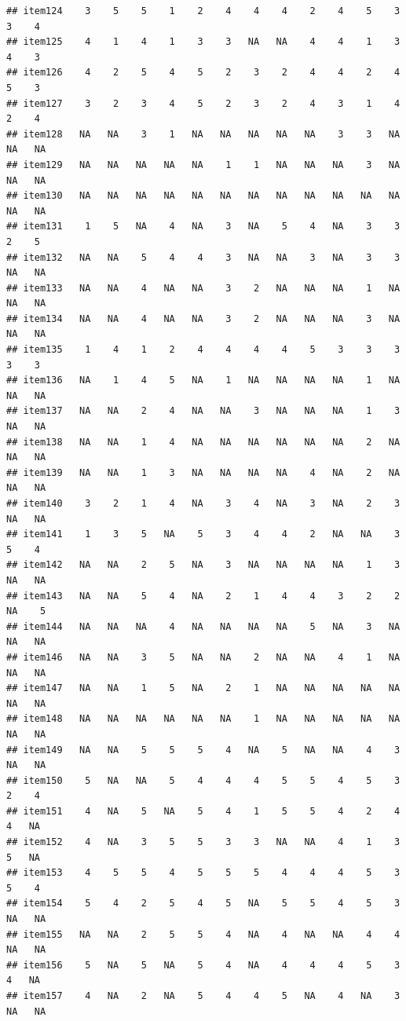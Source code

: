 \documentclass[
  man]{apa6}
\begin{document}
\begin{verbatim}
## item124    3    5    5    1    2    4    4    4    2    4    5    3    3    4
## item125    4    1    4    1    3    3   NA   NA    4    4    1    3    4    3
## item126    4    2    5    4    5    2    3    2    4    4    2    4    5    3
## item127    3    2    3    4    5    2    3    2    4    3    1    4    2    4
## item128   NA   NA    3    1   NA   NA   NA   NA   NA    3    3   NA   NA   NA
## item129   NA   NA   NA   NA   NA    1    1   NA   NA   NA    3   NA   NA   NA
## item130   NA   NA   NA   NA   NA   NA   NA   NA   NA   NA   NA   NA   NA   NA
## item131    1    5   NA    4   NA    3   NA    5    4   NA    3    3    2    5
## item132   NA   NA    5    4    4    3   NA   NA    3   NA    3    3   NA   NA
## item133   NA   NA    4   NA   NA    3    2   NA   NA   NA    1   NA   NA   NA
## item134   NA   NA    4   NA   NA    3    2   NA   NA   NA    3   NA   NA   NA
## item135    1    4    1    2    4    4    4    4    5    3    3    3    3    3
## item136   NA    1    4    5   NA    1   NA   NA   NA   NA    1   NA   NA   NA
## item137   NA   NA    2    4   NA   NA    3   NA   NA   NA    1    3   NA   NA
## item138   NA   NA    1    4   NA   NA   NA   NA   NA   NA    2   NA   NA   NA
## item139   NA   NA    1    3   NA   NA   NA   NA    4   NA    2   NA   NA   NA
## item140    3    2    1    4   NA    3    4   NA    3   NA    2    3   NA   NA
## item141    1    3    5   NA    5    3    4    4    2   NA   NA    3    5    4
## item142   NA   NA    2    5   NA    3   NA   NA   NA   NA    1    3   NA   NA
## item143   NA   NA    5    4   NA    2    1    4    4    3    2    2   NA    5
## item144   NA   NA   NA    4   NA   NA   NA   NA    5   NA    3   NA   NA   NA
## item146   NA   NA    3    5   NA   NA    2   NA   NA    4    1   NA   NA   NA
## item147   NA   NA    1    5   NA    2    1   NA   NA   NA   NA   NA   NA   NA
## item148   NA   NA   NA   NA   NA   NA    1   NA   NA   NA   NA   NA   NA   NA
## item149   NA   NA    5    5    5    4   NA    5   NA   NA    4    3   NA   NA
## item150    5   NA   NA    5    4    4    4    5    5    4    5    3    2    4
## item151    4   NA    5   NA    5    4    1    5    5    4    2    4    4   NA
## item152    4   NA    3    5    5    3    3   NA   NA    4    1    3    5   NA
## item153    4    5    5    4    5    5    5    4    4    4    5    3    5    4
## item154    5    4    2    5    4    5   NA    5    5    4    5    3   NA   NA
## item155   NA   NA    2    5    5    4   NA    4   NA   NA    4    4   NA   NA
## item156    5   NA    5   NA    5    4   NA    4    4    4    5    3    4   NA
## item157    4   NA    2   NA    5    4    4    5   NA    4   NA    3   NA   NA

\end{verbatim}
\end{document}
